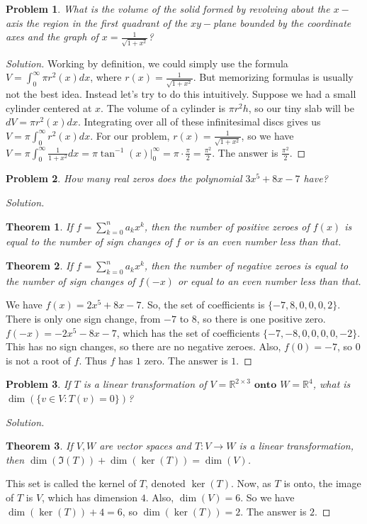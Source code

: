 \documentclass[12pt,oneside]{book}
\theoremstyle{mystyle}
\newtheorem{problem}{Problem}[section]
\newtheorem*{theorem*}{Theorem}
\begin{document}
\begin{problem}
What is the volume of the solid formed by revolving about the $x-$axis the region in the first quadrant of the $xy-$plane bounded by the coordinate axes and the graph of $x = \frac{1}{\sqrt{1+x^2}}$?
\end{problem}
\begin{proof}[Solution]
Working by definition, we could simply use the formula $V = \int_{0}^{\infty}\pi r^2(x)dx$, where $r(x) = \frac{1}{\sqrt{1+x^2}}$. But memorizing formulas is usually not the best idea. Instead let's try to do this intuitively. Suppose we had a small cylinder centered at $x$. The volume of a cylinder is $\pi r^2 h$, so our tiny slab will be $dV = \pi r^2(x) dx$. Integrating over all of these infinitesimal discs gives us $V = \pi \int_{0}^{\infty}r^2(x)dx$. For our problem, $r(x) = \frac{1}{\sqrt{1+x^2}}$, so we have $V = \pi \int_{0}^{\infty} \frac{1}{1+x^2}dx = \pi \tan^{-1}(x)\big|_{0}^{\infty} = \pi \cdot \frac{\pi}{2} = \frac{\pi^2}{2}$. The answer is $\frac{\pi^2}{2}$.
\end{proof}

\begin{problem}
How many real zeros does the polynomial $3x^5+8x-7$ have?
\end{problem}
\begin{proof}[Solution]
\begin{theorem*}
If $f = \sum_{k=0}^{n} a_k x^k$, then the number of positive zeroes of $f(x)$ is equal to the number of sign changes of $f$ or is an even number less than that.
\end{theorem*}
\begin{theorem*}
If $f=\sum_{k=0}^{n} a_k x^k$, then the number of negative zeroes is equal to the number of sign changes of $f(-x)$ or equal to an even number less than that.
\end{theorem*}
We have $f(x) = 2x^5+8x - 7$. So, the set of coefficients is $\{-7,8,0,0,0,2\}$. There is only one sign change, from $-7$ to $8$, so there is one positive zero. $f(-x) = -2x^5 - 8x - 7$, which has the set of coefficients $\{-7,-8,0,0,0,0,-2\}$. This has no sign changes, so there are no negative zeroes. Also, $f(0) = -7$, so $0$ is not a root of $f$. Thus $f$ has $1$ zero. The answer is $1$.
\end{proof}

\begin{problem}
If $T$ is a linear transformation of $V = \mathbb{R}^{2\times 3}$ $\textbf{onto}$ $W = \mathbb{R}^4$, what is $\dim(\{v\in V:T(v) = 0\})$?
\end{problem}
\begin{proof}[Solution]
\begin{theorem*}
If $V,W$ are vector spaces and $T:V\rightarrow W$ is a linear transformation, then $\dim(\Im(T)) + \dim(\ker(T)) = \dim(V)$.
\end{theorem*}
This set is called the kernel of $T$, denoted $\ker(T)$. Now, as $T$ is onto, the image of $T$ is $V$, which has dimension $4$. Also, $\dim(V) = 6$. So we have $\dim(\ker(T)) + 4 = 6$, so $\dim(\ker(T)) = 2$. The answer is $2$.
\end{proof}
\end{document}
